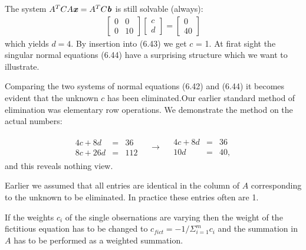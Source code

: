 The system $ A^{T}CA\textbf{\textit{x}} = A^{T}C\textbf{\textit{b}}$ is still solvable (always):
\begin{align}
\begin{bmatrix}
0 & 0\\
0 & 10
\end{bmatrix}
\begin{bmatrix}
c\\
d
\end{bmatrix} = 
\begin{bmatrix}
0\\
40
\end{bmatrix}
\end{align}
which yields $d = 4$. By insertion into (6.43) we get $c$ = 1. At firat sight the singular normal equations (6.44) have a surprising structure which we want to illustrate.

Comparing the two systems of normal equations (6.42) and (6.44) it becomes evident that the unknown $c$ has been eliminated.Our earlier standard method of elimination was elementary row operations. We demonstrate the method on the actual numbers:

\begin{align}
\begin{aligned}
4c+8d & = & 36 \\
8c+26d & = & 112
\end{aligned}  \quad 
\rightarrow    \quad 
\begin{aligned}
4c+8d & = & 36\\
10d   & = & 40,
\end{aligned}
\end{align}
and this reveals nothing view.

Earlier we assumed that all entries are identical in the column of $A$ corresponding to the unknown to be eliminated. In practice these entries often are 1.

If the weights $c_{i}$ of the single obsernations are varying then the weight of the fictitious equation has to be changed to $ c_{fict} = -1/\Sigma^{m}_{i=1}c_{i}$ and the summation in $A$ has to be performed as a weighted summation. 

